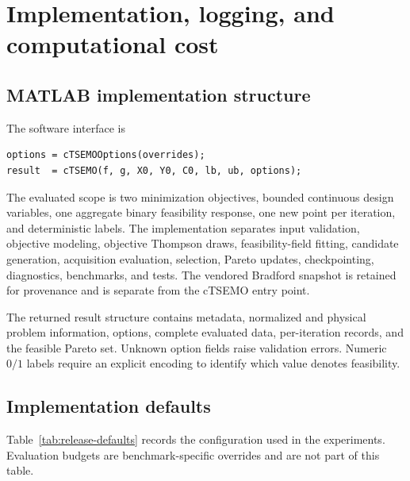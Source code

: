 \documentclass[twoside]{article}
\begin{document}
\section{Implementation, logging, and computational cost}

\subsection{MATLAB implementation structure}

The software interface is
\begin{verbatim}
options = cTSEMOOptions(overrides);
result  = cTSEMO(f, g, X0, Y0, C0, lb, ub, options);
\end{verbatim}
The evaluated scope is two minimization objectives, bounded continuous design
variables, one aggregate binary feasibility response, one new point per
iteration, and deterministic labels. The implementation separates input
validation, objective modeling, objective Thompson draws, feasibility-field fitting,
candidate generation, acquisition evaluation, selection, Pareto updates,
checkpointing, diagnostics, benchmarks, and tests.  The vendored Bradford
snapshot is retained for provenance and is separate from the cTSEMO entry point.

The returned result structure contains metadata, normalized and physical problem
information, options, complete evaluated data, per-iteration records, and the
feasible Pareto set. Unknown option fields raise validation errors. Numeric
\(0/1\) labels require an explicit encoding to identify which value denotes
feasibility.

\subsection{Implementation defaults}

Table~\ref{tab:release-defaults} records the configuration used in the
experiments. Evaluation budgets are benchmark-specific overrides and are not
part of this table.
\end{document}
